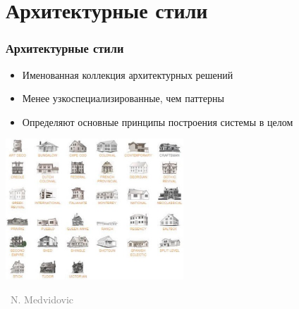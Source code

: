 \documentclass[xetex,mathserif,serif]{beamer}
\newcommand{\attribution}[1] {
    \vspace{-5mm}\begin{flushright}\begin{scriptsize}\textcolor{gray}{\textcopyright\, #1}\end{scriptsize}\end{flushright}
}
\begin{document}
    \section{Архитектурные стили}

    \begin{frame}
        \frametitle{Архитектурные стили}
        \begin{itemize}
            \item Именованная коллекция архитектурных решений
            \item Менее узкоспециализированные, чем паттерны
            \item Определяют основные принципы построения системы в целом
        \end{itemize}
        \begin{center}
            \includegraphics[width=0.5\textwidth]{buildingStyles.png}
            \attribution{N. Medvidovic}
        \end{center}
    \end{frame}
\end{document}
